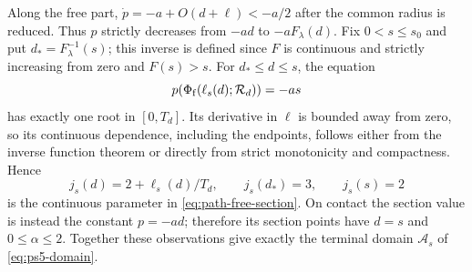 Along the free part, $\dot p=-a+O(d+\ell)<-a/2$ after the common
radius is reduced. Thus $p$ strictly decreases from $-ad$ to
$-aF_\lambda(d)$. Fix $0<s\le s_0$ and put
$d_*=F_\lambda^{-1}(s)$; this inverse is defined since $F$ is
continuous and strictly increasing from zero and $F(s)>s$.
For $d_*\le d\le s$, the equation
\begin{equation}
 p(\Phi_{\rm f}(\ell_s(d);\mathcal R_d))=-as
 \label{gr:section-root}
\end{equation}
has exactly one root in $[0,T_d]$. Its derivative in $\ell$ is
bounded away from zero, so its continuous dependence, including
the endpoints, follows either from the inverse function theorem
or directly from strict monotonicity and compactness. Hence
\begin{equation}
 j_s(d)=2+\ell_s(d)/T_d,
 \qquad j_s(d_*)=3,\qquad j_s(s)=2
 \label{gr:free-section-definition}
\end{equation}
is the continuous parameter in \eqref{eq:path-free-section}.
On contact the section value is instead the constant $p=-ad$;
therefore its section points have $d=s$ and $0\le\alpha\le2$.
Together these observations give exactly the terminal domain
$\mathcal A_s$ of \eqref{eq:ps5-domain}.
